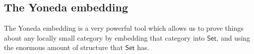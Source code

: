 \documentclass[a4paper,10pt]{scrreprt}
\theoremstyle{definition}
\theoremstyle{plain}
\theoremstyle{remark}
\begin{document}
\subsection{The Yoneda embedding}
The Yoneda embedding is a very powerful tool which allows us to prove things about any locally small category by embedding that category into $\mathsf{Set}$, and using the enormous amount of structure that $\mathsf{Set}$ has. 

%
%
%
%
\end{document}
